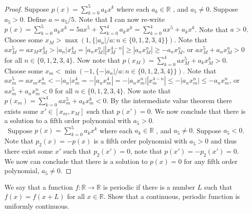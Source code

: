 \documentclass[12pt]{article}
\makeatletter
\theoremstyle{homework}
\newenvironment{exercise}[1]
{\def\@currentlabel{#1}\exercisecore}
{\endexercisecore}
\makeatother
\begin{document}
\begin{proof}
Suppose $p(x) = \sum^5_{k=0} a_kx^k$ where each $a_k\in\mathbb{R}$ , and $a_5 \neq 0$.  Suppose $a_5>0$.  Define $a=a_5/5$.  Note that I can now re-write $p(x) = \sum^5_{k=0} a_kx^k=5ax^5+\sum^4_{k=0} a_kx^k=\sum^4_{k=0} ax^5+a_kx^k$.  Note that $a>0$.  Choose some $x_M>\max(1,\{|a_n|/a:n\in\{0,1,2,3,4\}\})$.  Note that $ax_M^5=ax_Mx_M^4>|a_n|x_M^4=|a_nx_M^n||x_M^{4-n}|\geq |a_nx_M^n|\geq -a_nx_M^n$, or $ax_M^5+a_nx_M^n>0$ for all $n\in\{0,1,2,3,4\}$.  Now note that $p(x_M) =\sum^4_{k=0} ax_M^5+a_kx_M^k>0$.  Choose some $x_m<\min(-1,\{-|a_n|/a:n\in\{0,1,2,3,4\}\})$.  Note that $ax_m^5=ax_mx_m^4<-|a_n|x_m^4=-|a_nx_m^4|=-|a_nx_m^n||x_m^{4-n}|\leq -|a_nx_m^n|\leq -a_nx_m^n$, or $ax_m^5+a_nx_m^n<0$ for all $n\in\{0,1,2,3,4\}$.  Now note that $p(x_m) =\sum^4_{k=0} ax_m^5+a_kx_m^k<0$.  By the intermediate value theorem there exists some $x'\in[x_m,x_M]$ such that $p(x')=0$.  We now conclude that there is a solution to a fifth order polynomial with $a_5>0$.\\\
Suppose $p(x) = \sum^5_{k=0} a_kx^k$ where each $a_k\in\mathbb{R}$ , and $a_5 \neq 0$.  Suppose $a_5<0$.  Note that $p_2(x)=-p(x)$ is a fifth order polynomial with $a_5>0$ and thus there exist some $x'$ such that $p_2(x')=0$, note that $p(x')=-p_2(x')=0$.  We now can conclude that there is a solution to $p(x) = 0$ for any fifth order polynomial, $a_5 \neq 0$.
\end{proof}
\begin{exercise}
4
We say that a function $f : \mathbb{R}\rightarrow\mathbb{R}$ is periodic if there is a number $L$ such that $f (x) =
f (x+L)$ for all $x \in\mathbb{R}$. Show that a continuous, periodic function is uniformly continuous.
\end{exercise}
\end{document}
